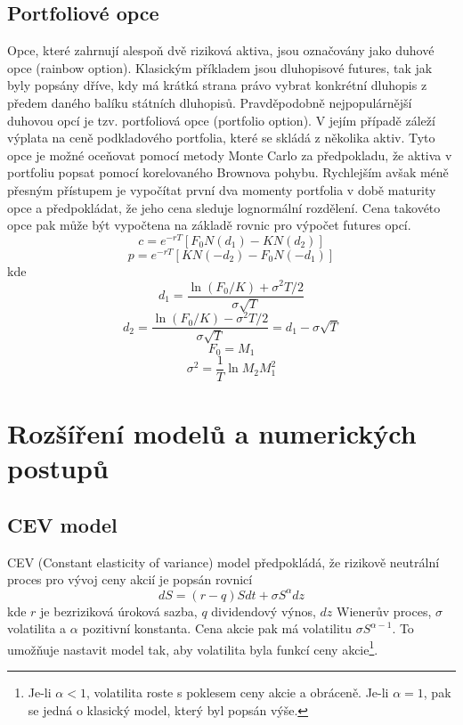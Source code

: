\documentclass[a4paper]{book}
\begin{document}
\section{Portfoliové opce}

Opce, které zahrnují alespoň dvě riziková aktiva, jsou označovány jako duhové opce (rainbow option). Klasickým příkladem jsou dluhopisové futures, tak jak byly popsány dříve, kdy má krátká strana právo vybrat konkrétní dluhopis z předem daného balíku státních dluhopisů. Pravděpodobně nejpopulárnější duhovou opcí je tzv. portfoliová opce (portfolio option). V jejím případě záleží výplata na ceně podkladového portfolia, které se skládá z několika aktiv. Tyto opce je možné oceňovat pomocí metody Monte Carlo za předpokladu, že aktiva v portfoliu popsat pomocí korelovaného Brownova pohybu. Rychlejším avšak méně přesným přístupem je vypočítat první dva momenty portfolia v době maturity opce a předpokládat, že jeho cena sleduje lognormální rozdělení. Cena takovéto opce pak může být vypočtena na základě rovnic pro výpočet futures opcí.
\begin{equation*}
c = e^{-rT}[F_0 N(d_1)-K N(d_2)]
\end{equation*}
\begin{equation*}
p = e^{-rT}[K N(-d_2)- F_0 N(-d_1)]
\end{equation*}
kde
\begin{equation*}
d_1 = \frac{\ln(F_0/K)+\sigma^2T/2}{\sigma \sqrt{T}}
\end{equation*}
\begin{equation*}
d_2 = \frac{\ln(F_0/K)-\sigma^2T/2}{\sigma \sqrt{T}}=d_1 - \sigma \sqrt{T}
\end{equation*}
\begin{equation*}
F_0 = M_1
\end{equation*}
\begin{equation*}
\sigma^2 = \frac{1}{T} \ln {M_2}{M_1^2}
\end{equation*}

\chapter{Rozšíření modelů a numerických postupů}

\section{CEV model}

CEV (Constant elasticity of variance) model předpokládá, že rizikově neutrální proces pro vývoj ceny akcií je popsán rovnicí
\begin{equation*}
dS = (r-q)Sdt + \sigma S^\alpha dz
\end{equation*}
kde $r$ je bezriziková úroková sazba, $q$ dividendový výnos, $dz$ Wienerův proces, $\sigma$ volatilita a $\alpha$ pozitivní konstanta. Cena akcie pak má volatilitu $\sigma S^{\alpha - 1}$. To umožňuje nastavit model tak, aby volatilita byla funkcí ceny akcie\footnote{Je-li $\alpha < 1$, volatilita roste s poklesem ceny akcie a obráceně. Je-li $\alpha = 1$, pak se jedná o klasický model, který byl popsán výše.}.
\end{document}

